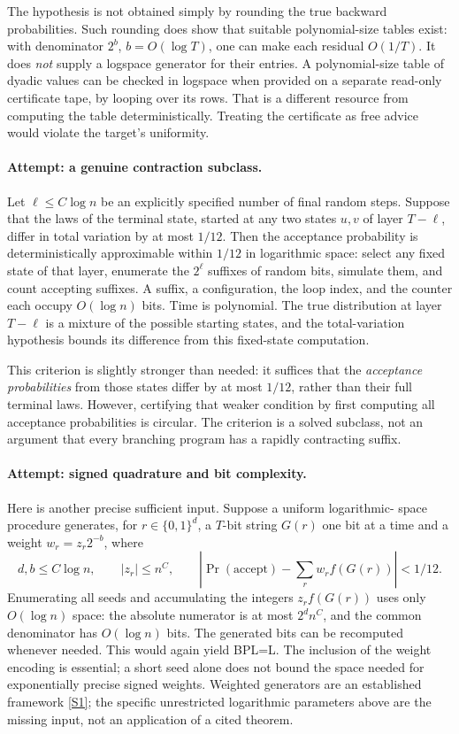 \documentclass[11pt,a4paper]{article}
\newcommand{\sref}[2]{\hyperlink{source:#1:#2}{[S#2]}}
\numberwithin{equation}{section}
\begin{document}
The hypothesis is not obtained simply by rounding the true backward
probabilities. Such rounding does show that suitable polynomial-size
tables exist: with denominator $2^b$, $b=O(\log T)$, one can make each
residual $O(1/T)$. It does \emph{not} supply a logspace generator for their
entries. A polynomial-size table of dyadic values can be checked in
logspace when provided on a separate read-only certificate tape, by
looping over its rows. That is a different resource from computing the
table deterministically. Treating the certificate as free advice would
violate the target's uniformity.

\paragraph{Attempt: a genuine contraction subclass.}
Let $\ell\le C\log n$ be an explicitly specified number of final random
steps. Suppose that the laws of the terminal state, started at any two
states $u,v$ of layer $T-\ell$, differ in total variation by at most
$1/12$. Then the acceptance probability is deterministically
approximable within $1/12$ in logarithmic space: select any fixed state
of that layer, enumerate the $2^\ell$ suffixes of random bits, simulate
them, and count accepting suffixes. A suffix, a configuration, the loop
index, and the counter each occupy $O(\log n)$ bits. Time is polynomial.
The true distribution at layer $T-\ell$ is a mixture of the possible
starting states, and the total-variation hypothesis bounds its difference
from this fixed-state computation.

This criterion is slightly stronger than needed: it suffices that the
\emph{acceptance probabilities} from those states differ by at most
$1/12$, rather than their full terminal laws. However, certifying that
weaker condition by first computing all acceptance probabilities is
circular. The criterion is a solved subclass, not an argument that every
branching program has a rapidly contracting suffix.

\paragraph{Attempt: signed quadrature and bit complexity.}
Here is another precise sufficient input. Suppose a uniform logarithmic-
space procedure generates, for $r\in\{0,1\}^d$, a $T$-bit string $G(r)$
one bit at a time and a weight $w_r=z_r2^{-b}$, where
\[
 d,b\le C\log n,\qquad |z_r|\le n^C,
 \qquad
 \left|\Pr(\mathrm{accept})-\sum_r w_r f(G(r))\right|<1/12.
\]
Enumerating all seeds and accumulating the integers $z_rf(G(r))$ uses
only $O(\log n)$ space: the absolute numerator is at most
$2^d n^C$, and the common denominator has $O(\log n)$ bits. The generated
bits can be recomputed whenever needed. This would again yield BPL=L.
The inclusion of the weight encoding is essential; a short seed alone
does not bound the space needed for exponentially precise signed weights.
Weighted generators are an established framework \sref{30004922}{1}; the
specific unrestricted logarithmic parameters above are the missing input,
not an application of a cited theorem.
\end{document}
